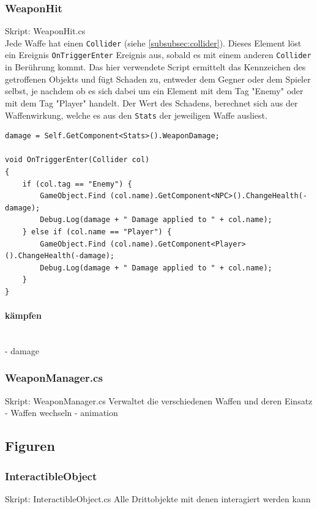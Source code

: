 \subsubsection{WeaponHit}
Skript: WeaponHit.cs\\

Jede Waffe hat einen \lstinline{Collider} (siehe \cref{subsubsec:collider}). Dieses Element löst ein Ereignis \lstinline{OnTriggerEnter} Ereignis aus, sobald es mit einem anderen \lstinline{Collider} in Berührung kommt.
Das hier verwendete Script ermittelt das Kennzeichen des getroffenen Objekts und fügt Schaden zu, entweder dem Gegner oder dem Spieler selbst, je nachdem ob es sich dabei um ein Element mit dem Tag "Enemy" oder mit dem Tag "Player" handelt.
Der Wert des Schadens, berechnet sich aus der Waffenwirkung, welche es aus den \lstinline{Stats} der jeweiligen Waffe ausliest.

\begin{lstlisting}[caption={Waffentreffer}]
damage = Self.GetComponent<Stats>().WeaponDamage;

void OnTriggerEnter(Collider col)
{
	if (col.tag == "Enemy") {
		GameObject.Find (col.name).GetComponent<NPC>().ChangeHealth(-damage);
		Debug.Log(damage + " Damage applied to " + col.name);
	} else if (col.name == "Player") {
		GameObject.Find (col.name).GetComponent<Player>().ChangeHealth(-damage);
		Debug.Log(damage + " Damage applied to " + col.name);
	}
}
\end{lstlisting}

\paragraph{kämpfen}\mbox{} \\
- damage

\subsubsection{WeaponManager.cs}
Skript: WeaponManager.cs
Verwaltet die verschiedenen Waffen und deren Einsatz
- Waffen wechseln
- animation

\subsection{Figuren}


\subsubsection{InteractibleObject}
Skript: InteractibleObject.cs
Alle Drittobjekte mit denen interagiert werden kann

